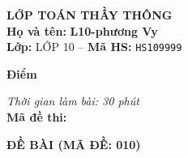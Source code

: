 \noindent
\begin{tcolorbox}[colback=white,colframe=black,arc=0mm,boxrule=0.8pt,top=4pt,bottom=4pt,left=6pt,right=6pt]
	\begin{minipage}[c]{0.44\textwidth}
		{\bfseries\large LỚP TOÁN THẦY THÔNG}\\[3pt]
		\textbf{Họ và tên:} \textbf{\large L10-phương Vy}\\[3pt]
		\textbf{Lớp:} LỚP 10 \quad -- \quad \textbf{Mã HS:} \texttt{HS109999}
	\end{minipage}
	\hfill
	\begin{minipage}[c]{0.22\textwidth}
		\begin{tcolorbox}[colback=white,colframe=black,arc=0mm,boxrule=0.6pt,height=1.8cm,halign=center,valign=top,top=2pt]
			{\bfseries\normalsize Điểm}
		\end{tcolorbox}
	\end{minipage}
	\hfill
	\begin{minipage}[c]{0.30\textwidth}
		\raggedleft
		\textit{Thời gian làm bài: 30 phút}\\[4pt]
		\textbf{Mã đề thi:} 
	\end{minipage}
\end{tcolorbox}
\vspace{0.25cm}

\noindent\textbf{\large ĐỀ BÀI (MÃ ĐỀ: 010)}
\vspace{0.1cm}

